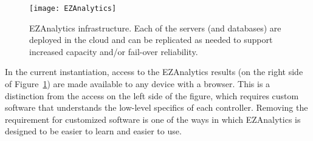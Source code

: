 \begin{figure}[htbp]
 \center
\texttt{[image: EZAnalytics]}
    \caption{EZAnalytics infrastructure. Each of the servers (and databases)
are deployed
in the cloud and can be replicated as needed to support increased capacity
and/or fail-over reliability.}
    \label{online}
\end{figure}

In the current instantiation, access to the EZAnalytics results (on the
right side of Figure~\ref{online}) are
made available to any device with a browser.  This is a distinction from
the access on the left side of the figure, which requires custom
software that understands the low-level specifics of each controller.
Removing the requirement for customized software is one of the ways
in which EZAnalytics is designed to be easier to learn and easier to use.
